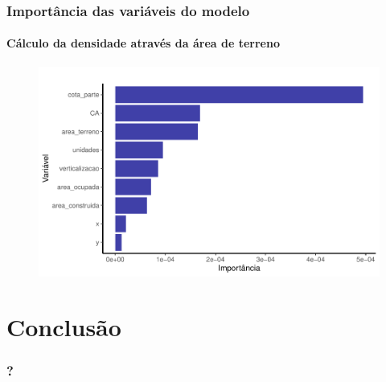 \documentclass[%
    9pt, 
    aspectratio=169,
]{beamer}
\begin{document}
\begin{frame}
    \frametitle{Importância das variáveis do modelo}
    \framesubtitle{Cálculo da densidade através da área de terreno}
    \begin{figure}
        \includegraphics[width = .8\textwidth]{imagens/var_importance_densmod.pdf}
    \end{figure}
\end{frame}


\section{Conclusão}

\begin{frame}
    \frametitle{?}
\end{frame}

\end{document}
